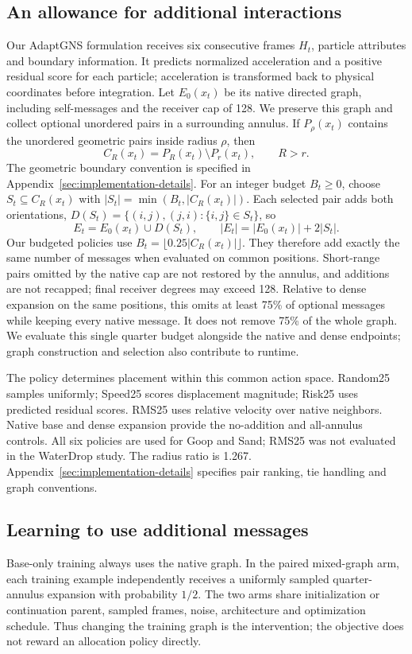 \subsection{An allowance for additional interactions}
Our AdaptGNS formulation receives six consecutive frames $H_t$, particle attributes and boundary information. It predicts normalized acceleration and a positive residual score for each particle; acceleration is transformed back to physical coordinates before integration. Let $E_0(x_t)$ be its native directed graph, including self-messages and the receiver cap of 128. We preserve this graph and collect optional unordered pairs in a surrounding annulus. If $P_\rho(x_t)$ contains the unordered geometric pairs inside radius $\rho$, then
\[
 C_R(x_t)=P_R(x_t)\setminus P_r(x_t),\qquad R>r.
\]
The geometric boundary convention is specified in Appendix~\ref{sec:implementation-details}.
For an integer budget $B_t\ge0$, choose $S_t\subseteq C_R(x_t)$ with $|S_t|=\min(B_t,|C_R(x_t)|)$. Each selected pair adds both orientations, $D(S_t)=\{(i,j),(j,i):\{i,j\}\in S_t\}$, so
\begin{equation}
 E_t=E_0(x_t)\cup D(S_t),\qquad |E_t|=|E_0(x_t)|+2|S_t|.
 \label{eq:budget}
\end{equation}
Our budgeted policies use $B_t=\lfloor0.25|C_R(x_t)|\rfloor$. They therefore add exactly the same number of messages when evaluated on common positions. Short-range pairs omitted by the native cap are not restored by the annulus, and additions are not recapped; final receiver degrees may exceed 128. Relative to dense expansion on the same positions, this omits at least 75\% of optional messages while keeping every native message. It does not remove 75\% of the whole graph. We evaluate this single quarter budget alongside the native and dense endpoints; graph construction and selection also contribute to runtime.

The policy determines placement within this common action space. Random25 samples uniformly; Speed25 scores displacement magnitude; Risk25 uses predicted residual scores. RMS25 uses relative velocity over native neighbors. Native base and dense expansion provide the no-addition and all-annulus controls. All six policies are used for Goop and Sand; RMS25 was not evaluated in the WaterDrop study. The radius ratio is 1.267. Appendix~\ref{sec:implementation-details} specifies pair ranking, tie handling and graph conventions.

\subsection{Learning to use additional messages}
Base-only training always uses the native graph. In the paired mixed-graph arm, each training example independently receives a uniformly sampled quarter-annulus expansion with probability $1/2$. The two arms share initialization or continuation parent, sampled frames, noise, architecture and optimization schedule. Thus changing the training graph is the intervention; the objective does not reward an allocation policy directly.


